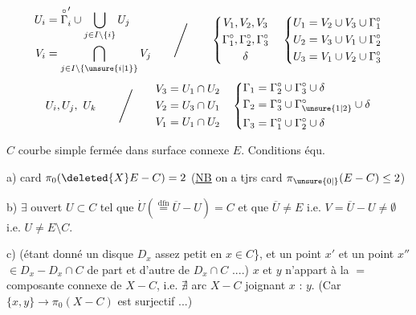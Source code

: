 \[
\begin{aligned}
 U_i&=\overset{\circ}{\Gamma}'_i\cup\bigcup_{j\in I\setminus\{i\}}U_j\\
 V_i&=\bigcap_{j\in I\setminus\{\unsure{i|1}\}}V_j
\end{aligned}
\qquad\Bigg/\qquad
\left\{\begin{gathered}
 V_1,V_2,V_3\\ \Gamma_1^\circ,\Gamma_2^\circ,\Gamma_3^\circ\\ \delta
\end{gathered}\right.
\quad
\left\{\begin{aligned}
 U_1&=V_2\cup V_3\cup\Gamma_1^\circ\\
 U_2&=V_3\cup V_1\cup\Gamma_2^\circ\\
 U_3&=V_1\cup V_2\cup\Gamma_3^\circ
\end{aligned}\right.
\]
\[
 U_i,U_j,\ U_k\qquad\Bigg/\qquad
\begin{aligned}
 V_3&=U_1\cap U_2\\
 V_2&=U_3\cap U_1\\
 V_1&=U_1\cap U_2
\end{aligned}
\quad
\left\{\begin{aligned}
 \Gamma_1&=\Gamma_2^\circ\cup\Gamma_3^\circ\cup\delta\\
 \Gamma_2&=\Gamma_3^\circ\cup\Gamma_{\unsure{1|2}}^\circ\cup\delta\\
 \Gamma_3&=\Gamma_1^\circ\cup\Gamma_2^\circ\cup\delta
\end{aligned}\right.
\]

$C$ courbe simple fermée dans surface connexe $E$. Conditions équ.

a) card $\pi_0(\deleted{X}E-C)=2$ \quad (\uline{NB} on a tjrs card $\pi_{\unsure{0|{}}}(E-C)\le 2$)

b) $\exists$ ouvert $U\subset C$ tel que $\dot U(\overset{\text{dfn}}{=}\overline U-U)=C$ et que 
$\overline U\ne E$ i.e. $V=\overline U-U\ne\emptyset$ i.e. $U\ne E\setminus C$.

c) (étant donné un disque $D_x$ assez petit  en $x\in C$\}, et un point $x'$ et un point $x''$ $\in D_x-D_x\cap C$ de part et d'autre de $D_x\cap C$ ....)
$x$ et $y$ n'appart  à la $=$ composante connexe de $X-C$, i.e. $\nexists$ arc  $X-C$ joignant $x$ : $y$.
(Car $\{x,y\}\longrightarrow\pi_0(X-C)$ est surjectif ...)
